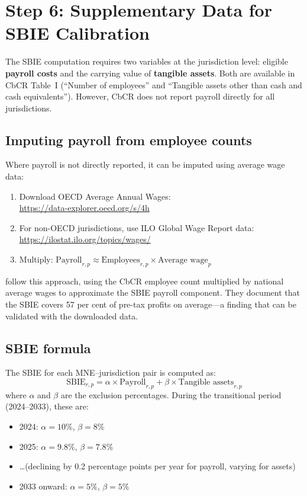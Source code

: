 \documentclass[12pt,a4paper]{article}
\begin{document}
\section{Step 6: Supplementary Data for SBIE Calibration}\label{sec:sbie}

The SBIE computation requires two variables at the jurisdiction level: eligible \textbf{payroll costs} and the carrying value of \textbf{tangible assets}.
Both are available in CbCR Table~I (``Number of employees'' and ``Tangible assets other than cash and cash equivalents'').
However, CbCR does not report payroll directly for all jurisdictions.

\subsection{Imputing payroll from employee counts}

Where payroll is not directly reported, it can be imputed using average wage data:

\begin{enumerate}
\item Download OECD Average Annual Wages:\\
\url{https://data-explorer.oecd.org/s/4h}
\item For non-OECD jurisdictions, use ILO Global Wage Report data:\\
\url{https://ilostat.ilo.org/topics/wages/}
\item Multiply: $\text{Payroll}_{r,p} \approx \text{Employees}_{r,p} \times \text{Average wage}_p$
\end{enumerate}

\textcite{devereux2023} follow this approach, using the CbCR employee count multiplied by national average wages to approximate the SBIE payroll component.
They document that the SBIE covers 57 per cent of pre-tax profits on average---a finding that can be validated with the downloaded data.

\subsection{SBIE formula}

The SBIE for each MNE--jurisdiction pair is computed as:
\[
\text{SBIE}_{r,p} = \alpha \times \text{Payroll}_{r,p} + \beta \times \text{Tangible assets}_{r,p}
\]
where $\alpha$ and $\beta$ are the exclusion percentages.
During the transitional period (2024--2033), these are:
\begin{itemize}
    \item 2024: $\alpha = 10\%$, $\beta = 8\%$
    \item 2025: $\alpha = 9.8\%$, $\beta = 7.8\%$
    \item \ldots (declining by 0.2 percentage points per year for payroll, varying for assets)
    \item 2033 onward: $\alpha = 5\%$, $\beta = 5\%$
\end{itemize}
\end{document}
